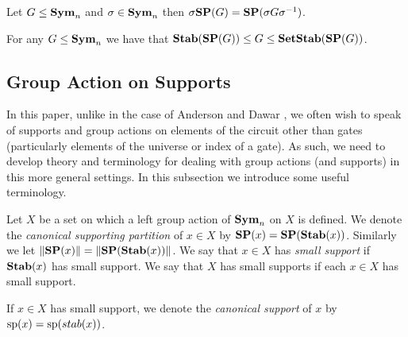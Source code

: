 \documentclass[../paper.tex]{subfiles}
\begin{document}
\begin{lem}
  \label{lem:SP_conjugation}
  Let $G \leq \text{\textbf{Sym}}_n$ and $\sigma \in \text{\textbf{Sym}}_n$ then $\sigma \text{\textbf{SP}} (G) = \text{\textbf{SP}}(\sigma
  G \sigma^{-1})$.
\end{lem}

\begin{lem}
  For any $G \leq \text{\textbf{Sym}}_n$ we have that $\text{\textbf{Stab}} (\text{\textbf{SP}} (G)) \leq G \leq
  \text{\textbf{SetStab}}(\text{\textbf{SP}}(G))$.
\end{lem}

\subsection{Group Action on Supports}
In this paper, unlike in the case of Anderson and Dawar \cite{AndersonD17}, we
often wish to speak of supports and group actions on elements of the circuit
other than gates (particularly elements of the universe or index of a gate). As
such, we need to develop theory and terminology for dealing with group actions
(and supports) in this more general settings. In this subsection we introduce
some useful terminology.

\begin{definition}
  Let $X$ be a set on which a left group action of $\text{\textbf{Sym}}_n$ on $X$ is
  defined. We denote the \emph{canonical supporting partition} of $x \in X$ by
  $\text{\textbf{SP}} (x) = \text{\textbf{SP}} (\text{\textbf{Stab}}(x))$. Similarly we let $\| \text{\textbf{SP}} (x) \| = \| \text{\textbf{SP}}
  (\text{\textbf{Stab}}(x)) \|$. We say that $x \in X$ has \emph{small support} if
  $\text{\textbf{Stab}}(x)$ has small support. We say that $X$ has small supports if each $x
  \in X$ has small support.

  If $x \in X$ has small support, we denote the \emph{canonical support} of $x$
  by $\text{sp}(x) = \text{sp} (stab(x))$.
\end{definition}

\end{document}
